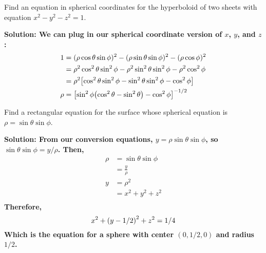 \begin{example}
    Find an equation in spherical coordinates for the hyperboloid of two sheets with equation \(x^2-y^2-z^2=1\).\par\bf{Solution: }We can plug in our spherical coordinate version of \(x\), \(y\), and \(z\):
    \begin{align*}
        1 &= (\rho\cos\theta\sin\phi)^2-(\rho\sin\theta\sin\phi)^2-(\rho\cos\phi)^2 \\
        &= \rho^2\cos^2\theta\sin^2\phi-\rho^2\sin^2\theta\sin^2\phi-\rho^2\cos^2\phi \\
        &= \rho^2\bqty{\cos^2\theta\sin^2\phi-\sin^2\theta\sin^2\phi-\cos^2\phi} \\
        \rho &= \bqty{\sin^2\phi\pqty{\cos^2\theta-\sin^2\theta}-\cos^2\phi}^{-1/2}
    \end{align*}
\end{example}
\begin{example}
    Find a rectangular equation for the surface whose spherical equation is \(\rho = \sin\theta\sin\phi\).\par\bf{Solution: }From our conversion equations, \(y=\rho\sin\theta\sin\phi\), so \(\sin\theta\sin\phi = y/\rho\). Then,
    \begin{align*}
        \rho &= \sin\theta\sin\phi \\
        &= \frac{y}{\rho} \\
        y &= \rho ^2 \\
        &= x^2+y^2+z^2 \\
    \end{align*}
    Therefore,
    \[x^2+\pqty{y-1/2}^2+z^2=1/4\]
    Which is the equation for a sphere with center \((0, 1/2, 0)\) and radius \(1/2\).
\end{example}